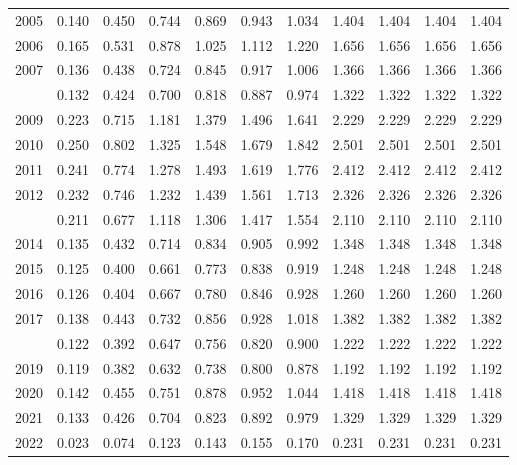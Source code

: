 \documentclass[
]{article}
\begin{document}
\begin{longtable}[t]{lrrrrrrrrrr}
2005 & 0.140 & 0.450 & 0.744 & 0.869 & 0.943 & 1.034 & 1.404 & 1.404 & 1.404 & 1.404\\
2006 & 0.165 & 0.531 & 0.878 & 1.025 & 1.112 & 1.220 & 1.656 & 1.656 & 1.656 & 1.656\\
2007 & 0.136 & 0.438 & 0.724 & 0.845 & 0.917 & 1.006 & 1.366 & 1.366 & 1.366 & 1.366\\
\addlinespace
2008 & 0.132 & 0.424 & 0.700 & 0.818 & 0.887 & 0.974 & 1.322 & 1.322 & 1.322 & 1.322\\
2009 & 0.223 & 0.715 & 1.181 & 1.379 & 1.496 & 1.641 & 2.229 & 2.229 & 2.229 & 2.229\\
2010 & 0.250 & 0.802 & 1.325 & 1.548 & 1.679 & 1.842 & 2.501 & 2.501 & 2.501 & 2.501\\
2011 & 0.241 & 0.774 & 1.278 & 1.493 & 1.619 & 1.776 & 2.412 & 2.412 & 2.412 & 2.412\\
2012 & 0.232 & 0.746 & 1.232 & 1.439 & 1.561 & 1.713 & 2.326 & 2.326 & 2.326 & 2.326\\
\addlinespace
2013 & 0.211 & 0.677 & 1.118 & 1.306 & 1.417 & 1.554 & 2.110 & 2.110 & 2.110 & 2.110\\
2014 & 0.135 & 0.432 & 0.714 & 0.834 & 0.905 & 0.992 & 1.348 & 1.348 & 1.348 & 1.348\\
2015 & 0.125 & 0.400 & 0.661 & 0.773 & 0.838 & 0.919 & 1.248 & 1.248 & 1.248 & 1.248\\
2016 & 0.126 & 0.404 & 0.667 & 0.780 & 0.846 & 0.928 & 1.260 & 1.260 & 1.260 & 1.260\\
2017 & 0.138 & 0.443 & 0.732 & 0.856 & 0.928 & 1.018 & 1.382 & 1.382 & 1.382 & 1.382\\
\addlinespace
2018 & 0.122 & 0.392 & 0.647 & 0.756 & 0.820 & 0.900 & 1.222 & 1.222 & 1.222 & 1.222\\
2019 & 0.119 & 0.382 & 0.632 & 0.738 & 0.800 & 0.878 & 1.192 & 1.192 & 1.192 & 1.192\\
2020 & 0.142 & 0.455 & 0.751 & 0.878 & 0.952 & 1.044 & 1.418 & 1.418 & 1.418 & 1.418\\
2021 & 0.133 & 0.426 & 0.704 & 0.823 & 0.892 & 0.979 & 1.329 & 1.329 & 1.329 & 1.329\\
2022 & 0.023 & 0.074 & 0.123 & 0.143 & 0.155 & 0.170 & 0.231 & 0.231 & 0.231 & 0.231\\*
\end{longtable}
\end{document}
